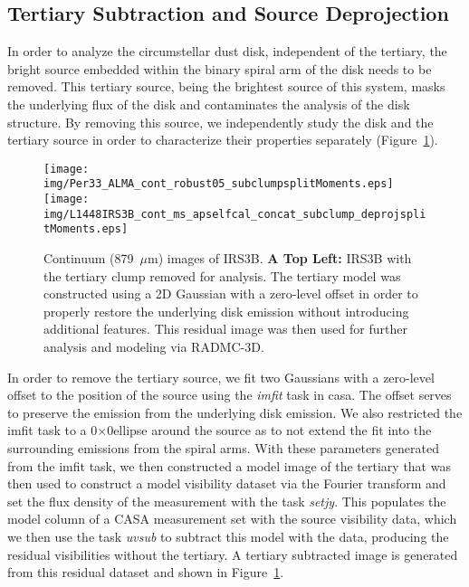 \documentclass[preprint,12pt]{aastex62}
\renewcommand{\micron}{$\mu$m}
\begin{document}
\subsection{Tertiary Subtraction and Source Deprojection}
In order to analyze the circumstellar dust disk, independent of the tertiary, the bright source embedded within the binary spiral arm of the disk needs to be removed. This tertiary source, being the brightest source of this system, masks the underlying flux of the disk and contaminates the analysis of the disk structure. By removing this source, we independently study the disk and the tertiary source in order to characterize their properties separately (Figure~\ref{fig:subclump}).

\begin{figure}[H]
  \begin{minipage}[c]{\textwidth}
   \texttt{[image: img/Per33\_ALMA\_cont\_robust05\_subclumpsplitMoments.eps]} %
   \texttt{[image: img/L1448IRS3B\_cont\_ms\_apselfcal\_concat\_subclump\_deprojsplitMoments.eps]} %
  \end{minipage}
   \caption{Continuum (879~\micron) images of IRS3B. 
   \textbf{A Top Left:} IRS3B with the tertiary clump removed for analysis. The tertiary model was constructed using a 2D Gaussian with a zero-level offset in order to properly restore the underlying disk emission without introducing additional features. This residual image was then used for further analysis and modeling via RADMC-3D.} \label{fig:subclump}
\end{figure}
In order to remove the tertiary source, we fit two Gaussians with a zero-level offset to the position of the source using the \textit{imfit} task in casa. The offset serves to preserve the emission from the underlying disk emission. We also restricted the imfit task to a 0$\times$0\space ellipse around the source as to not extend the fit into the surrounding emissions from the spiral arms. With these parameters generated from the imfit task, we then constructed a model image of the tertiary that was then used to construct a model visibility dataset via the Fourier transform and set the flux density of the measurement with the task \textit{setjy}. This populates the model column of a CASA measurement set with the source visibility data, which we then use the task \textit{uvsub} to subtract this model with the data, producing the residual visibilities without the tertiary. A tertiary subtracted image is generated from this residual dataset and shown in Figure~\ref{fig:subclump}.
\end{document}

